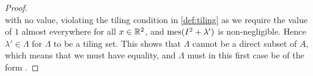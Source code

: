 \documentclass[../thesis.tex]{subfiles}
\begin{document}
\begin{proof}
\begin{equation*}
    \end{equation*}
    with no value, violating the tiling condition in \cref{def:tiling} as we require the value of $1$ almost everywhere for all $x\in \mathbb{R}^2$, and $\operatorname{mes}(I^2 + \lambda')$ is non-negligible. Hence $\lambda'\in \Lambda$ for $\Lambda$ to be a tiling set. This shows that $\Lambda$ cannot be a direct subset of $A$, which means that we must have equality, and $\Lambda$ must in this first case be of the form . %



\end{proof}
















\end{document}
